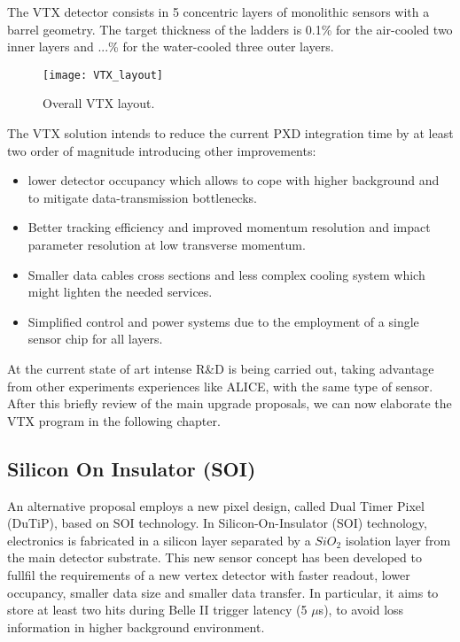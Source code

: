 The VTX detector consists in 5 concentric layers of monolithic sensors with a barrel geometry. The target thickness of the ladders is 0.1\% for the air-cooled two inner layers and ...\% for the water-cooled three outer layers.

\begin{figure}[h!]
\centering
\texttt{[image: VTX\_layout]}
\caption{Overall VTX layout.}
\label{fig:VTX_layout}
\end{figure}

The VTX solution intends to reduce the current PXD integration time by at least two order of magnitude introducing other improvements:

\begin{itemize}
\item lower detector occupancy which allows to cope with higher background and to mitigate data-transmission bottlenecks.
\item Better tracking efficiency and improved momentum resolution and impact parameter resolution at low transverse momentum.
\item Smaller data cables cross sections and less complex cooling system which might lighten the needed services.
\item Simplified control and power systems due to the employment of a single sensor chip for all layers.
\end{itemize}

At the current state of art intense R\&D is being carried out, taking advantage from other experiments experiences like ALICE, with the same type of sensor.\\

After this briefly review of the main upgrade proposals, we can now elaborate the VTX program in the following chapter.

\begin{comment}
Among all these options that we sift through, the last one has been chosen for the future upgrade of the vertex detector. The first two proposals have now been abandoned, the one that contemplates the use of the SOI technology instead, is considered as a backup option. \\
\end{comment}


\subsection{Silicon On Insulator (SOI)}

An alternative proposal employs a new pixel design, called Dual Timer Pixel (DuTiP), based on SOI technology. In Silicon-On-Insulator (SOI) technology, electronics is fabricated in a silicon layer separated by a $SiO_{2}$ isolation layer from the main detector substrate.
This new sensor concept has been developed to fullfil the requirements of a new vertex detector with faster readout, lower occupancy, smaller data size and smaller data transfer. In particular, it aims to store at least two hits during Belle II trigger latency (5 $\mu$s), to avoid loss information in higher background environment. \\

